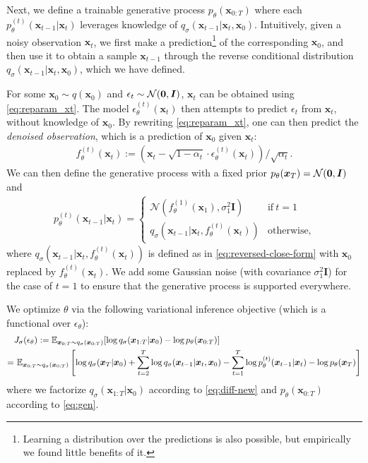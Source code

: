 Next, we define a trainable generative process $p_\theta(\bm{x}_{0:T})$ where each $p_{\theta}^{(t)}(\bm{x}_{t-1} | \bm{x}_t)$ %
 leverages knowledge of $q_\sigma(\bm{x}_{t-1} | \bm{x}_{t}, \bm{x}_0)$. %
Intuitively, given a noisy observation $\bm{x}_t$, we first make a prediction\footnote{Learning a distribution over the predictions is also possible, but empirically we found little benefits of it.} of the corresponding $\bm{x}_0$, 
and then use it to obtain a sample $\bm{x}_{t-1}$ through the reverse conditional distribution $q_\sigma(\bm{x}_{t-1} | \bm{x}_{t}, \bm{x}_0)$, which we have defined. %

For some $\bm{x}_0 \sim q(\bm{x}_0)$ and $\epsilon_t \sim \mathcal{N}({\bm{0}}, \bm{I})$, 
$\bm{x}_t$ can be obtained using \eqref{eq:reparam_xt}. The model $\epsilon_\theta^{(t)}(\bm{x}_t)$ then attempts to predict $\epsilon_t$ from $\bm{x}_t$, without knowledge of $\bm{x}_0$.
By rewriting \eqref{eq:reparam_xt}, one can then predict the \textit{denoised observation}, which is a prediction of $\bm{x}_0$ given $\bm{x}_t$:
\begin{align}
    f_\theta^{(t)}(\bm{x}_t) := (\bm{x}_t - \sqrt{1 - \alpha_t} \cdot \epsilon_{\theta}^{(t)}(\bm{x}_t)) / \sqrt{\alpha_t}. \label{eq:x0-pred-def}
\end{align}
We can then define the generative process with a fixed prior $p_\theta(\bm{x}_T) = \mathcal{N}({\bm{0}}, \bm{I})$ and
\begin{align}
    p_\theta^{(t)}(\bm{x}_{t-1} | \bm{x}_t) = \begin{cases}
    \mathcal{N}(f_\theta^{(1)}(\bm{x}_1), \sigma_1^2 \bm{I})  & \text{if} \ t = 1 \\
    q_\sigma(\bm{x}_{t-1} | \bm{x}_t, f_{\theta}^{(t)}(\bm{x}_t)) & \text{otherwise,}
    \end{cases} \label{eq:new-reverse}
\end{align}
where $q_\sigma(\bm{x}_{t-1} | \bm{x}_t, f_{\theta}^{(t)}(\bm{x}_t))$ is defined as in \eqref{eq:reversed-close-form} with $\bm{x}_0$ replaced by $f_{\theta}^{(t)}(\bm{x}_t)$. %
We add some Gaussian noise (with covariance $\sigma_1^2 \bm{I}$) for the case of $t = 1$ to ensure that the generative process is supported everywhere. 

We optimize $\theta$ via the following variational inference objective (which is a functional over $\epsilon_\theta$):
\begin{align}
   & J_\sigma(\epsilon_\theta) :=
   \bb{E}_{\bm{x}_{0:T} \sim q_\sigma(\bm{x}_{0:T})}[\log q_\sigma(\bm{x}_{1:T} | \bm{x}_0) - \log p_\theta(\bm{x}_{0:T})] \\
   = & \ \bb{E}_{\bm{x}_{0:T} \sim q_\sigma(\bm{x}_{0:T})} \left[\log q_\sigma(\bm{x}_T | \bm{x}_0) + \sum_{t=2}^{T} \log q_\sigma(\bm{x}_{t-1} | \bm{x}_t, \bm{x}_0) - \sum_{t=1}^{T} \log p_\theta^{(t)}(\bm{x}_{t-1} | \bm{x}_t) - \log p_\theta(\bm{x}_T) \right] \nonumber%
\end{align}
where we factorize $q_\sigma(\bm{x}_{1:T} | \bm{x}_0)$ according to \eqref{eq:diff-new} and $p_\theta(\bm{x}_{0:T})$ according to \eqref{eq:gen}.


